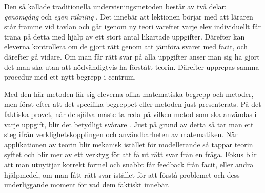\textcolor{lila}{Den så kallade traditionella undervisningsmetoden består av två delar: \textsl{genomgång} och \textsl{egen räkning} \cite{traditionellMatte}. Det innebär att lektionen börjar med att läraren står framme vid tavlan och går igenom ny teori varefter varje elev individuellt får träna på detta med hjälp av ett stort antal likartade uppgifter. Därefter kan eleverna kontrollera om de gjort rätt genom att jämföra svaret med facit, och därefter gå vidare. Om man får rätt svar på alla uppgifter anser man sig ha gjort det man ska utan att nödvändigtvis ha förstått teorin. Därefter upprepas samma procedur med ett nytt begrepp i centrum.} 
    
\textcolor{lila}{Med den här metoden lär sig eleverna olika matematiska begrepp och metoder, men först efter att det specifika begreppet eller metoden just presenterats. På det faktiska provet, när de själva måste ta reda på vilken metod som ska användas i varje uppgift, blir det betydligt svårare \cite{TheElephant}.}
\textcolor{WildStrawberry}{
    Just på grund av detta så tar man ett steg ifrån verklighetskopplingen och användbarheten av matematiken. När applikationen av teorin blir mekanisk istället för modellerande så tappar teorin syftet och blir mer av ett verktyg för att få ut rätt svar från en fråga. Fokus blir att man utnyttjar korrekt formel och snabbt får feedback från facit, eller andra hjälpmedel, om man fått rätt svar istället för att förstå problemet och dess underliggande moment för vad dem faktiskt innebär. }